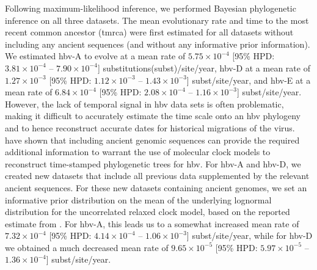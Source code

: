 Following maximum-likelihood inference, we performed Bayesian phylogenetic inference on all three datasets.
The mean evolutionary rate and time to the most recent common ancestor (\gls{tmrca}) were first estimated for all datasets without including any ancient sequences (and without any informative prior information).
We estimated \gls{hbv}-A to evolve at a mean rate of $5.75 \times 10^{-4}$ [95\% HPD: $3.81 \times 10^{-4}$ -- $7.90 \times 10^{-4}$] substitutions(subst)/site/year, \gls{hbv}-D at a mean rate of $1.27 \times 10^{-3}$ [95\% HPD: $1.12 \times 10^{-3}$ -- $1.43 \times 10^{-3}$] subst/site/year, and \gls{hbv}-E at a mean rate of $6.84 \times 10^{-4}$ [95\% HPD: $2.08 \times 10^{-4}$ -- $1.16 \times 10^{-3}$] subst/site/year.
However, the lack of temporal signal in \gls{hbv} data sets is often problematic, making it difficult to accurately estimate the time scale onto an \gls{hbv} phylogeny and to hence reconstruct accurate dates for historical migrations of the virus.
\citet{muhlemann2018ancient} have shown that including ancient genomic sequences can provide the required additional information to warrant the use of molecular clock models to reconstruct time-stamped phylogenetic trees for \gls{hbv}.
For \gls{hbv}-A and \gls{hbv}-D, we created new datasets that include all previous data supplemented by the relevant ancient sequences.
For these new datasets containing ancient genomes, we set an informative prior distribution on the mean of the underlying lognormal distribution for the uncorrelated relaxed clock model, based on the reported estimate from \citet{muhlemann2018ancient}.
For \gls{hbv}-A, this leads us to a somewhat increased mean rate of $7.32 \times 10^{-4}$ [95\% HPD: $4.14 \times 10^{-4}$ -- $1.06 \times 10^{-3}$] subst/site/year, while for \gls{hbv}-D we obtained a much decreased mean rate of $9.65 \times 10^{-5}$ [95\% HPD: $5.97 \times 10^{-5}$ -- $1.36 \times 10^{-4}$] subst/site/year.


